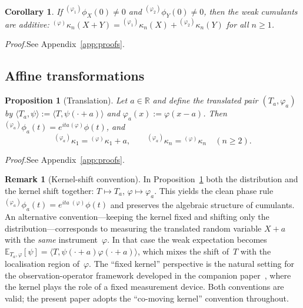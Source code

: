 \documentclass[12pt]{article}
\newtheorem{proposition}[theorem]{Proposition}
\newtheorem{corollary}[theorem]{Corollary}
\theoremstyle{definition}
\newtheorem{remark}[theorem]{Remark}
\newcommand{\R}{\mathbb{R}}
\newcommand{\E}{\mathbb{E}}
\begin{document}
\begin{corollary}\label{cor:cumulant-additivity}
If ${}^{(\varphi_1)}\phi_X(0)\neq 0$ and ${}^{(\varphi_2)}\phi_Y(0)\neq 0$, then the weak cumulants are additive: ${}^{(\varphi)}\kappa_n(X+Y) = {}^{(\varphi_1)}\kappa_n(X) + {}^{(\varphi_2)}\kappa_n(Y)$ for all $n \geq 1$.
\end{corollary}

\noindent\textit{Proof.}\enspace See Appendix~\ref{app:proofs}.\medskip

\subsection{Affine transformations}
\label{subsec:independence_transformations}

\begin{proposition}[Translation]\label{prop:translation}
Let $a \in \R$ and define the translated pair $(T_a,\varphi_a)$ by $\langle T_a,\psi\rangle := \langle T,\psi(\cdot + a)\rangle$ and $\varphi_a(x):=\varphi(x-a)$.  Then ${}^{(\varphi_a)}\phi_a(t)=e^{ita}{}^{(\varphi)}\phi(t)$, and
\[
{}^{(\varphi_a)}\kappa_1 = {}^{(\varphi)}\kappa_1 + a,
\qquad
{}^{(\varphi_a)}\kappa_n = {}^{(\varphi)}\kappa_n \quad (n \geq 2).
\]
\end{proposition}

\noindent\textit{Proof.}\enspace See Appendix~\ref{app:proofs}.\medskip

\begin{remark}[Kernel-shift convention]\label{rem:kernel-shift}
In Proposition~\ref{prop:translation} both the distribution and the
kernel shift together: $T\mapsto T_a$, $\varphi\mapsto\varphi_a$.
This yields the clean phase rule
${}^{(\varphi_a)}\phi_a(t)=e^{ita}\,{}^{(\varphi)}\phi(t)$ and
preserves the algebraic structure of cumulants.  An alternative
convention---keeping the kernel fixed and shifting only the
distribution---corresponds to measuring the translated random
variable $X+a$ with the \emph{same} instrument~$\varphi$.  In that
case the weak expectation becomes
$\E_{T_a,\varphi}[\psi] = \langle T,
\psi(\cdot+a)\varphi(\cdot+a)\rangle$, which mixes the shift of~$T$
with the localisation region of~$\varphi$.  The ``fixed kernel''
perspective is the natural setting for the observation-operator
framework developed in the companion paper~\cite{LabouriauPaperD},
where the kernel plays the role of a fixed measurement device.  Both
conventions are valid; the present paper adopts the ``co-moving
kernel'' convention throughout.
\end{remark}
\end{document}
